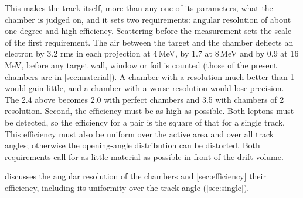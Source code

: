 This makes the track itself, more than any one of its parameters, what the chamber is judged on, and it sets two requirements: angular resolution of about one degree and high efficiency. Scattering before the measurement sets the scale of the first requirement. The
air between the target and the chamber deflects an electron by 3.2\textdegree{} rms in each projection
at 4\,MeV, by 1.7\textdegree{} at 8\,MeV and by 0.9\textdegree{} at 16\,MeV, before any target wall, window or foil is
counted (those of the present chambers are in \cref{sec:material}). A chamber with a resolution much better than 1\textdegree{} would
gain little, and a chamber with a worse resolution would lose precision. The 2.4\textdegree{} above becomes 2.0\textdegree{} with perfect chambers and
3.5\textdegree{} with chambers of 2\textdegree{} resolution. Second, the efficiency must be as high as possible. Both leptons must be detected, so the efficiency for a pair is the square of that for a single track. This efficiency must also be uniform over the active area and over all track angles; otherwise the opening-angle distribution can be distorted. Both requirements call for as little
material as possible in front of the drift volume.

 discusses the angular resolution of the chambers and \cref{sec:efficiency} their efficiency,
including its uniformity over the track angle (\cref{sec:single}).
